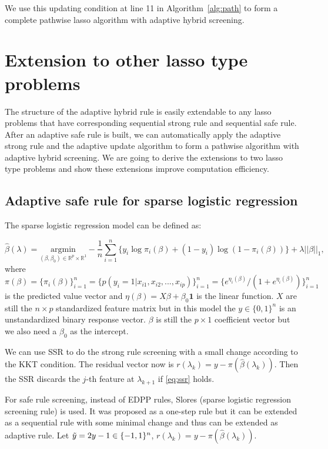 We use this updating condition at line 11 in Algorithm~\ref{alg:path} to form a complete pathwise lasso algorithm with adaptive hybrid screening. 

\section{Extension to other lasso type problems}
\label{sec:4}

The structure of the adaptive hybrid rule is easily extendable to any lasso problems that have corresponding sequential strong rule and sequential safe rule. After an adaptive safe rule is built, we can automatically apply the adaptive strong rule and the adaptive update algorithm to form a pathwise algorithm with adaptive hybrid screening. We are going to derive the extensions to two lasso type problems and show these extensions improve computation efficiency.

\subsection{Adaptive safe rule for sparse logistic regression}

The sparse logistic regression model can be defined as:

\begin{equation}
    \label{eq:logis}
    \hat{\beta}(\lambda)=\underset{(\beta,\beta_0)\in \mathbb{R}^p\times\mathbb{R}^1}{\mathrm{argmin}}-\frac{1}{n}\sum_{i=1}^n\{y_i\log\pi_i(\beta)+(1-y_i)\log(1-\pi_i(\beta))\}+\lambda||\beta||_1,
\end{equation}
where $\pi(\beta)=\{\pi_i(\beta)\}_{i=1}^n=\{p(y_i=1|x_{i1},x_{i2},...,x_{ip})\}_{i=1}^n=\{e^{\eta_i(\beta)}/(1+e^{\eta_i(\beta)})\}_{i=1}^n$ is the predicted value vector and $\eta(\beta)=X\beta+\beta_0\mathbf{1}$ is the linear function. $X$ are still the $n\times p$ standardized feature matrix but in this model the $y\in\{0,1\}^n$ is an unstandardized binary response vector. $\beta$ is still the $p\times1$ coefficient vector but we also need a $\beta_0$ as the intercept.

We can use SSR to do the strong rule screening with a small change according to the KKT condition. The residual vector now is $r(\lambda_k)=y-\pi(\hat{\beta}(\lambda_k))$. Then the SSR discards the $j$-th feature at $\lambda_{k+1}$ if \eqref{eq:ssr} holds.

For safe rule screening, instead of EDPP rules, Slores (sparse logistic regression screening rule)\citep{wang2014safe} is used. It was proposed as a one-step rule but it can be extended as a sequential rule with some minimal change and thus can be extended as adaptive rule. Let $\Tilde{y}=2y-1\in\{-1,1\}^n$, $r(\lambda_k)=y-\pi(\hat{\beta}(\lambda_k))$.

